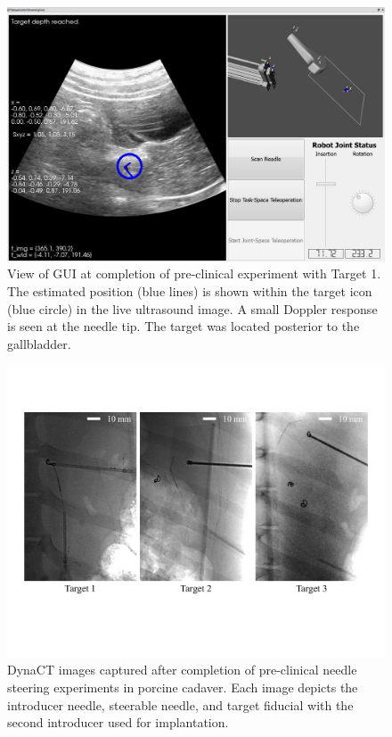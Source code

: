 \begin{figure}[!t]
\centering
\includegraphics[width = \columnwidth]{./Images/Chapter5/CadaverAtTarget/CadaverAtTarget.jpg}%
\caption[GUI at completion of pre-clinical experiment]{View of GUI at completion of pre-clinical experiment with Target 1. The estimated position (blue lines) is shown within the target icon (blue circle) in the live ultrasound image. A small Doppler response is seen at the needle tip. The target was located posterior to the gallbladder.}
\label{fig:CadaverAtTarget}
\end{figure}  

\begin{figure}[!t]
\centering
\includegraphics[width = \columnwidth]{./Images/Chapter5/TargetsCT/TargetsCT.pdf}%
\caption[DynaCT images captured after pre-clinical experiments]{DynaCT images captured after completion of pre-clinical needle steering experiments in porcine cadaver. Each image depicts the introducer needle, steerable needle, and target fiducial with the second introducer used for implantation.}
\label{fig:CadaverTargetsCT}
\end{figure} 

